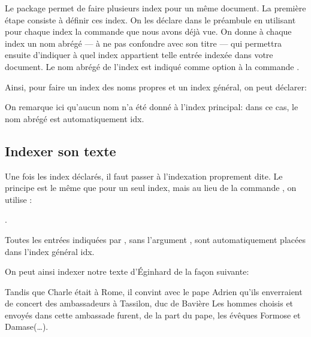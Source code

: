 Le package  permet de faire plusieurs index pour un même document. La première étape consiste à définir ces index. On les déclare dans le préambule en utilisant pour chaque index la commande  que nous avons déjà vue. On donne à chaque index un nom  abrégé --- à ne pas confondre avec son titre --- qui permettra ensuite d'indiquer  à quel index appartient telle entrée indexée dans votre document. Le nom abrégé de l'index est indiqué comme  option à la commande  .


Ainsi, pour faire un index des noms propres et un index général, on peut déclarer:

\begin{latexcode}
\makeindex[title=Index principal]
\makeindex[name=npr, title=Index des noms propres] 
\end{latexcode}

On remarque ici qu'aucun nom n'a été donné à l'index principal: dans ce cas, le nom abrégé est automatiquement idx.

\subsection{Indexer son texte}
Une fois  les index déclarés, il faut passer à l'indexation proprement dite. Le principe est le même que pour un seul index,
mais au lieu de la commande , on utilise :

. 

\begin{plusloins}

Toutes les entrées indiquées  par , sans l'argument , sont automatiquement placées dans l'index général idx.


\end{plusloins}
On peut ainsi indexer notre texte d'Éginhard de la façon suivante:

\begin{latexcode}
Tandis que Charle était à Rome, il convint
avec le pape Adrien qu’ils enverraient de concert
des ambassadeurs à Tassilon, duc de Bavière
\textelp{}
Les hommes choisis et envoyés dans cette ambassade furent, de 
la part du pape, les évêques Formose et 
Damase(…).
\end{latexcode}



